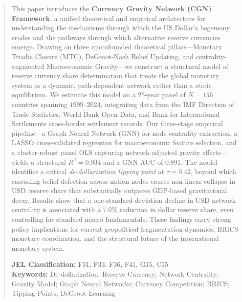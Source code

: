 \documentclass[12pt, letterpaper]{article}
\theoremstyle{definition}
\begin{document}
\begin{abstract}
\noindent
This paper introduces the \textbf{Currency Gravity Network (CGN) Framework}, a unified theoretical and empirical architecture for understanding the mechanisms through which the US Dollar's hegemony erodes and the pathways through which alternative reserve currencies emerge. Drawing on three microfounded theoretical pillars---Monetary Triadic Closure (MTC), DeGroot-Nash Belief Updating, and centrality-augmented Macroeconomic Gravity---we construct a structural model of reserve currency share determination that treats the global monetary system as a dynamic, path-dependent network rather than a static equilibrium. We estimate this model on a 25-year panel of $N = 156$ countries spanning $1999$--$2024$, integrating data from the IMF Direction of Trade Statistics, World Bank Open Data, and Bank for International Settlements cross-border settlement records. Our three-stage empirical pipeline---a Graph Neural Network (GNN) for node centrality extraction, a LASSO cross-validated regression for macroeconomic feature selection, and a cluster-robust panel OLS capturing network-adjusted gravity effects---yields a structural $R^2 = 0.934$ and a GNN AUC of $0.891$. The model identifies a critical \textit{de-dollarization tipping point} at $\tau = 0.42$, beyond which cascading belief defection across nation-nodes causes non-linear collapse in USD reserve share that substantially outpaces GDP-based gravitational decay. Results show that a one-standard-deviation decline in USD network centrality is associated with a $7.0$\% reduction in dollar reserve share, even controlling for standard macro fundamentals. These findings carry strong policy implications for current geopolitical fragmentation dynamics, BRICS monetary coordination, and the structural future of the international monetary system.

\vspace{6pt}
\noindent
\textbf{JEL Classification:} F31, F33, F36, F41, G15, C55\\
\textbf{Keywords:} De-dollarization; Reserve Currency; Network Centrality; Gravity Model; Graph Neural Networks; Currency Competition; BRICS; Tipping Points; DeGroot Learning
\end{abstract}

\doublespacing
\newpage

\end{document}
